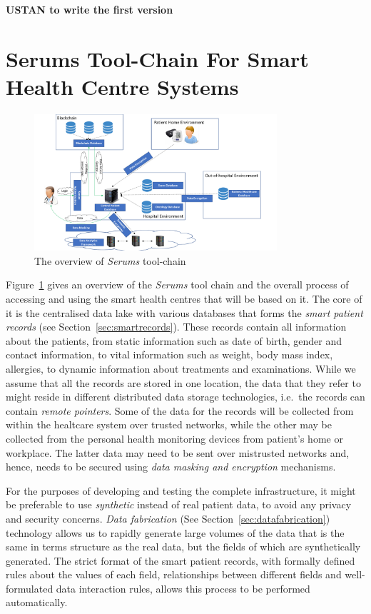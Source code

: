\textbf{USTAN to write the first version}

\section{Serums Tool-Chain For Smart Health Centre Systems}

\begin{figure}[ht!]
    \centering
    \includegraphics[width=90mm]{images/SerumsOverview.pdf}
    \caption{The overview of \emph{Serums} tool-chain}
    \label{fig:serumsTools}
\end{figure}

\noindent Figure~\ref{fig:serumsTools} gives an overview of the \emph{Serums} tool chain and the overall process of accessing and using the smart health centres that will be based on it. The core of it is the centralised data lake with various databases that forms the \emph{smart patient records} (see Section~\ref{sec:smartrecords}). These records contain all information about the patients, from static information such as date of birth, gender and contact information, to vital information such as weight, body mass index, allergies, to dynamic information about treatments and examinations. While we assume that all the records are stored in one location, the data that they refer to might reside in different distributed data storage technologies, i.e.~the records can contain \emph{remote pointers}. Some of the data for the records will be collected from within the healtcare system over trusted networks, while the other may be collected from the personal health monitoring devices from patient's home or workplace. The latter data may need to be sent over mistrusted networks and, hence, needs to be secured using \emph{data masking and encryption} mechanisms.

For the purposes of developing and testing the complete infrastructure, it might be preferable to use \emph{synthetic} instead of real patient data, to avoid any privacy and security concerns. \emph{Data fabrication} (See Section~\ref{sec:datafabrication}) technology allows us to rapidly generate large volumes of the data that is the same in terms structure as the real data, but the fields of which are synthetically generated. The strict format of the smart patient records, with formally defined rules about the values of each field, relationships between different fields and well-formulated data interaction rules, allows this process to be performed automatically. 

